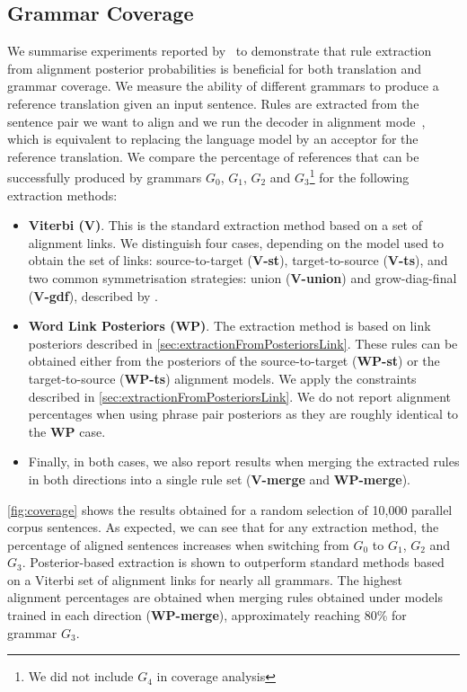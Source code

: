 \subsection{Grammar Coverage}
\label{sec:grammarcoverage}

We summarise experiments reported by~\citet{degispert-pino-byrne:2010:EMNLP} to
demonstrate that rule extraction from alignment posterior probabilities is
beneficial for both translation and grammar coverage. We measure
the ability of different grammars to produce a reference translation given an
input sentence. Rules are extracted from the sentence pair we want to align and
we run the decoder in alignment
mode~\citep{degispert-iglesias-blackwood-banga-byrne:2010:CL}, which is
equivalent to replacing the language model by an acceptor for the reference
translation. We compare the percentage of references that can be successfully
produced by grammars $G_0$, $G_1$, $G_2$ and
$G_3$\footnote{We did not include $G_4$ in coverage analysis} for the following
extraction methods:
%
\begin{itemize}
  \item {\bf Viterbi (V)}. This is the standard extraction method based on a set
of alignment links. We distinguish four cases, depending on the model used to
obtain the set of links: source-to-target ({\bf V-st}), target-to-source
({\bf V-ts}), and two common symmetrisation strategies: union ({\bf V-union})
and grow-diag-final ({\bf V-gdf}), described by
\citet{koehn-och-marcu:2003:NAACL}.
  \item {\bf Word Link Posteriors (WP)}. The extraction method is based on link
posteriors described in \autoref{sec:extractionFromPosteriorsLink}. These
rules can be obtained either from the posteriors of the source-to-target
({\bf WP-st}) or the target-to-source ({\bf WP-ts}) alignment models. We apply
the constraints described in \autoref{sec:extractionFromPosteriorsLink}. We
do not report alignment percentages when using phrase pair posteriors as they
are roughly identical to the {\bf WP} case.
  \item Finally, in both cases, we also report results when merging the
extracted rules in both directions into a single rule set ({\bf V-merge} and
{\bf WP-merge}).
\end{itemize}
%
\autoref{fig:coverage} shows the results obtained for a random selection of
10,000 parallel corpus sentences. As expected, we can see that for any
extraction method, the percentage of aligned sentences increases when switching
from $G_0$ to $G_1$, $G_2$ and $G_3$. Posterior-based extraction is shown to
outperform standard methods based on a Viterbi set of alignment links for nearly
all grammars. The highest alignment percentages are obtained when merging rules
obtained under models trained in each direction ({\bf WP-merge}), approximately
reaching 80\% for grammar $G_3$.

